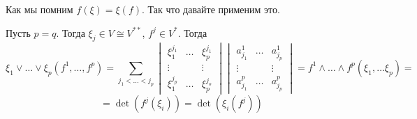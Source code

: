 Как мы помним $f(\xi) = \xi(f)$. Так что давайте применим это.

Пусть $p= q$. Тогда $\xi_j \in V  \cong V^{**}$, $f^j \in V^*$. Тогда
$$\xi_1 \vee \ldots \vee \xi_p(f^1,\ldots, f^p) = \sum\limits_{j_1<\ldots<j_p} \begin{vmatrix}
    \xi_1^{j_1} & \ldots & \xi_p^{j_1}\\
    \vdots & & \vdots \\
    \xi_1^{j_p} & \ldots &\xi_p^{j_o}
\end{vmatrix} \begin{vmatrix}
    a^1_{j_1} & \ldots & a^1_{j_p}\\
    \vdots & & \vdots \\
    a_{j_1}^p & \ldots & a^p_{j_p}
\end{vmatrix} = f^1 \wedge \ldots \wedge f^p(\xi_1,\ldots \xi_p) =$$
$$= \det (f^j(\xi_i))=\det (\xi_i(f^j))$$